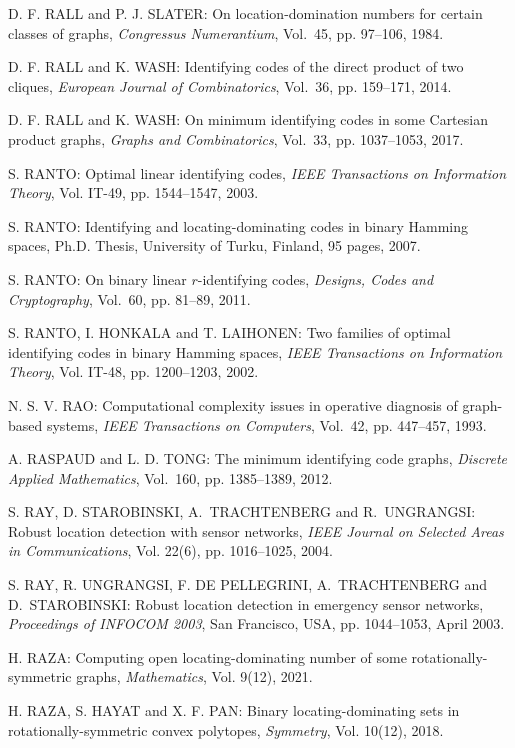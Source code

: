 \begin{thebibliography}{999}
D. F. RALL and P. J. SLATER: On location-domination numbers for certain classes of graphs, {\it Congressus Numerantium}, Vol.~45, pp. 97--106, 1984.

D. F. RALL and K. WASH: Identifying codes of the direct product of two cliques, {\it European Journal of Combinatorics}, Vol.~36, pp. 159--171, 2014.

D. F. RALL and K. WASH: On minimum identifying codes in some Cartesian product graphs, {\it Graphs and Combinatorics}, Vol.~33, pp. 1037--1053, 2017.

S. RANTO: Optimal linear identifying codes, {\it IEEE Transactions on Information Theory}, Vol. IT-49, pp. 1544--1547, 2003.

S. RANTO: Identifying and locating-dominating codes in binary Hamming spaces, Ph.D. Thesis, University of Turku, Finland, 95 pages, 2007.

S. RANTO: On binary linear $r$-identifying codes, {\it Designs, Codes and Cryptography}, Vol.~60, pp. 81--89, 2011.

S. RANTO, I. HONKALA and T. LAIHONEN: Two families of optimal identifying codes in binary Hamming spaces, {\it IEEE Transactions on Information Theory}, Vol. IT-48, pp. 1200--1203, 2002. 

N. S. V. RAO: Computational complexity issues in operative diagnosis of graph-based systems, {\it IEEE Transactions on Computers}, Vol.~42, pp. 447--457, 1993.

A. RASPAUD and L. D. TONG: The minimum identifying code graphs, {\it Discrete Applied Mathematics}, Vol.~160, pp. 1385--1389, 2012.

S. RAY, D. STAROBINSKI, A.~TRACHTENBERG and R.~UNGRANGSI: Robust location detection with sensor networks, {\it IEEE Journal on Selected Areas in Communications}, Vol. 22(6), pp. 1016--1025, 2004.

S. RAY, R. UNGRANGSI, F. DE PELLEGRINI, A.~TRACHTENBERG and D.~STAROBINSKI: Robust location detection in emergency sensor networks, {\it Proceedings of INFOCOM 2003}, San Francisco, USA, pp. 1044--1053, April 2003.

H. RAZA: Computing open locating-dominating number of some rotationally-symmetric graphs, {\it Mathematics},  Vol. 9(12), 2021.

H. RAZA, S. HAYAT and X. F. PAN: Binary locating-dominating sets in rotationally-symmetric convex polytopes, {\it Symmetry},  Vol. 10(12), 2018.


\end{thebibliography}
